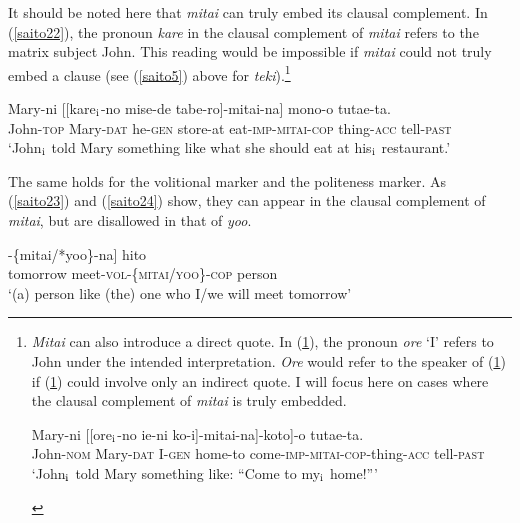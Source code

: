 \documentclass[output=paper]{langscibook}
\begin{document}
It should be noted here that \emph{mitai} can truly embed its clausal complement. In (\ref{saito22}), the pronoun \emph{kare} in the clausal complement of \emph{mitai} refers to the matrix subject John. This reading would be impossible if \emph{mitai} could not truly embed a clause  (see (\ref{saito5}) above for \emph{teki}).\footnote{\emph{Mitai} can also introduce a direct quote. In (\ref{saitoi2}), the pronoun \emph{ore} ‘I’ refers to John under the intended interpretation. \emph{Ore} would refer to the speaker of (\ref{saitoi2}) if (\ref{saitoi2}) could involve only an indirect quote. I will focus here on cases where the clausal complement of \emph{mitai} is truly embedded. 
\begin{exe}
\ex \label{saitoi2}
  {Mary-ni} [[{ore$_{\textnormal{i}}$-no} {ie-ni} {ko-i}]-{mitai-na]-koto]-o} {tutae-ta}.\\
John-\textsc{nom} Mary-\textsc{dat} I-\textsc{gen} home-to come-\textsc{imp-mitai-cop}-thing-\textsc{acc} tell-\textsc{past}\\ 
\glt ‘John$_{\textnormal{i}}$ told Mary something like: “Come to my$_{\textnormal{i}}$ home!”’

\end{exe}
}

\begin{exe}
\ex \label{saito22}
  {Mary-ni} [[{kare$_{\textnormal{i}}$-no} {mise-de} {tabe-ro}]-{mitai-na}] {mono-o} {tutae-ta}.\\
John-\textsc{top} Mary-\textsc{dat} he-\textsc{gen} store-at eat-\textsc{imp-mitai-cop} thing-\textsc{acc} tell-\textsc{past}\\ 
\glt ‘John$_{\textnormal{i}}$ told Mary something like what she should eat at his$_{\textnormal{i}}$ restaurant.’
\end{exe}

The same holds for the volitional marker and the politeness marker. As (\ref{saito23}) and (\ref{saito24}) show, they can appear in the clausal complement of \emph{mitai}, but are disallowed in that of \emph{yoo}.


\begin{exe}
\ex \label{saito23}
\gll [[{asita} {a-oo}]-\{{mitai/*yoo}\}-{na}] {hito}\\
tomorrow meet-\textsc{vol}-\{\textsc{mitai/yoo}\}-\textsc{cop} person\\ 
\glt  ‘(a) person like (the) one who I/we will meet tomorrow’
\end{exe}
\end{document}
